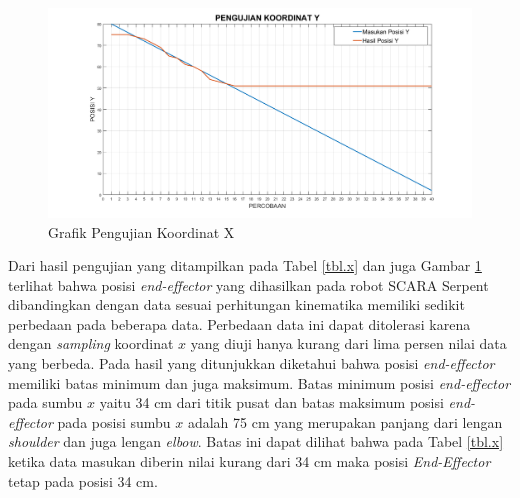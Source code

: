 \fontsize{12}{15}\selectfont
\begin{figure}[H]
	\centering
	\includegraphics[width=12cm]{gambar/px.png}
	\caption{Grafik Pengujian Koordinat X}
	\label{pic.koordinatx}
\end{figure}

Dari hasil pengujian yang ditampilkan pada Tabel \ref{tbl.x} dan juga Gambar \ref{pic.koordinatx} terlihat bahwa posisi \textit{end-effector} yang dihasilkan pada robot SCARA Serpent dibandingkan dengan data sesuai perhitungan kinematika memiliki sedikit perbedaan pada beberapa data. Perbedaan data ini dapat ditolerasi karena dengan \textit{sampling} koordinat $x$ yang diuji hanya kurang dari lima persen nilai data yang berbeda. Pada hasil yang ditunjukkan diketahui bahwa posisi \textit{end-effector} memiliki batas minimum dan juga maksimum. Batas minimum posisi \textit{end-effector} pada sumbu $x$ yaitu 34 cm dari titik pusat dan batas maksimum posisi \textit{end-effector} pada posisi sumbu $x$ adalah 75 cm yang merupakan panjang dari lengan \textit{shoulder} dan juga lengan \textit{elbow}. Batas ini dapat dilihat bahwa pada Tabel \ref{tbl.x} ketika data masukan diberin nilai kurang dari 34 cm maka posisi \textit{End-Effector} tetap pada posisi 34 cm.


